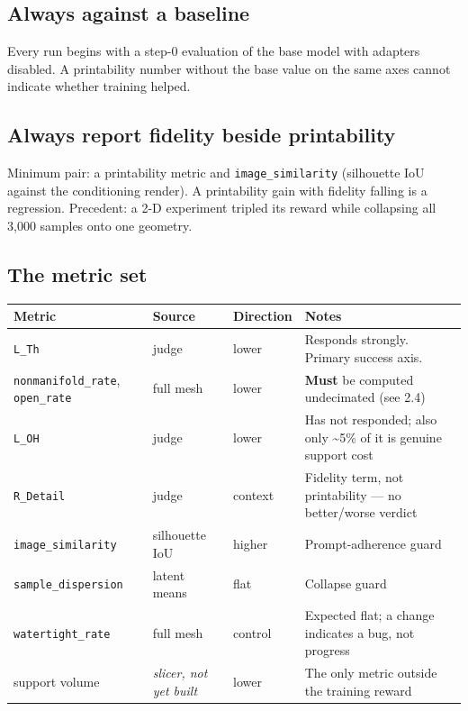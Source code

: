 \documentclass[11pt,a4paper]{article}
\begin{document}
\subsection{Always against a baseline}
Every run begins with a step-0 evaluation of the base model with adapters disabled. A printability
number without the base value on the same axes cannot indicate whether training helped.

\subsection{Always report fidelity beside printability}
Minimum pair: a printability metric and \texttt{image\_similarity} (silhouette IoU against the
conditioning render). A printability gain with fidelity falling is a regression. Precedent: a 2-D
experiment tripled its reward while collapsing all 3,000 samples onto one geometry.

\subsection{The metric set}
\begin{center}\small
\begin{tabular}{@{}llll@{}}
\toprule
\textbf{Metric} & \textbf{Source} & \textbf{Direction} & \textbf{Notes} \\
\midrule
\texttt{L\_Th} & judge & lower & Responds strongly. Primary success axis. \\
\texttt{nonmanifold\_rate}, \texttt{open\_rate} & full mesh & lower & \textbf{Must} be computed undecimated (see 2.4) \\
\texttt{L\_OH} & judge & lower & Has not responded; also only \textasciitilde{}5\% of it is genuine support cost \\
\texttt{R\_Detail} & judge & context & Fidelity term, not printability --- no better/worse verdict \\
\texttt{image\_similarity} & silhouette IoU & higher & Prompt-adherence guard \\
\texttt{sample\_dispersion} & latent means & flat & Collapse guard \\
\texttt{watertight\_rate} & full mesh & control & Expected flat; a change indicates a bug, not progress \\
support volume & \textit{slicer, not yet built} & lower & The only metric outside the training reward \\
\bottomrule
\end{tabular}
\end{center}
\end{document}
